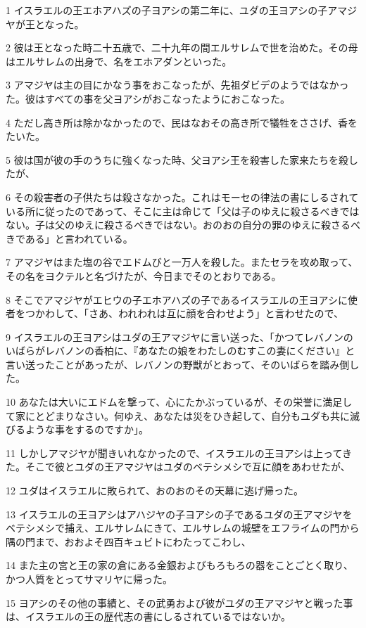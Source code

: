 \par 1 イスラエルの王エホアハズの子ヨアシの第二年に、ユダの王ヨアシの子アマジヤが王となった。
\par 2 彼は王となった時二十五歳で、二十九年の間エルサレムで世を治めた。その母はエルサレムの出身で、名をエホアダンといった。
\par 3 アマジヤは主の目にかなう事をおこなったが、先祖ダビデのようではなかった。彼はすべての事を父ヨアシがおこなったようにおこなった。
\par 4 ただし高き所は除かなかったので、民はなおその高き所で犠牲をささげ、香をたいた。
\par 5 彼は国が彼の手のうちに強くなった時、父ヨアシ王を殺害した家来たちを殺したが、
\par 6 その殺害者の子供たちは殺さなかった。これはモーセの律法の書にしるされている所に従ったのであって、そこに主は命じて「父は子のゆえに殺さるべきではない。子は父のゆえに殺さるべきではない。おのおの自分の罪のゆえに殺さるべきである」と言われている。
\par 7 アマジヤはまた塩の谷でエドムびと一万人を殺した。またセラを攻め取って、その名をヨクテルと名づけたが、今日までそのとおりである。
\par 8 そこでアマジヤがエヒウの子エホアハズの子であるイスラエルの王ヨアシに使者をつかわして、「さあ、われわれは互に顔を合わせよう」と言わせたので、
\par 9 イスラエルの王ヨアシはユダの王アマジヤに言い送った、「かつてレバノンのいばらがレバノンの香柏に、『あなたの娘をわたしのむすこの妻にください』と言い送ったことがあったが、レバノンの野獣がとおって、そのいばらを踏み倒した。
\par 10 あなたは大いにエドムを撃って、心にたかぶっているが、その栄誉に満足して家にとどまりなさい。何ゆえ、あなたは災をひき起して、自分もユダも共に滅びるような事をするのですか」。
\par 11 しかしアマジヤが聞きいれなかったので、イスラエルの王ヨアシは上ってきた。そこで彼とユダの王アマジヤはユダのベテシメシで互に顔をあわせたが、
\par 12 ユダはイスラエルに敗られて、おのおのその天幕に逃げ帰った。
\par 13 イスラエルの王ヨアシはアハジヤの子ヨアシの子であるユダの王アマジヤをベテシメシで捕え、エルサレムにきて、エルサレムの城壁をエフライムの門から隅の門まで、おおよそ四百キュビトにわたってこわし、
\par 14 また主の宮と王の家の倉にある金銀およびもろもろの器をことごとく取り、かつ人質をとってサマリヤに帰った。
\par 15 ヨアシのその他の事績と、その武勇および彼がユダの王アマジヤと戦った事は、イスラエルの王の歴代志の書にしるされているではないか。
